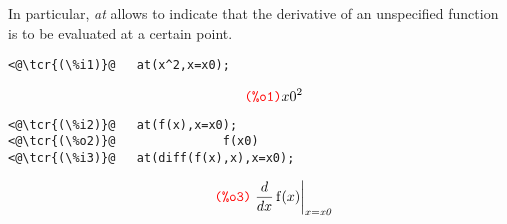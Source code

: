 \documentclass[../Maxima_Workbook.tex]{subfiles}
\begin{document}
\lz In particular, \emph{at} allows to indicate that the derivative of an unspecified function is to be evaluated at a certain point.

\lz \begin{small}
\color{blue} \leqn
\begin{lstlisting}
<@\tcr{(\%i1)}@   at(x^2,x=x0);
\end{lstlisting}
\vspace{-5mm} \[\tag*{\tcr{\ttfamily (\%o1)}} x0^2 \]
\vspace{-10mm} \begin{lstlisting}
<@\tcr{(\%i2)}@   at(f(x),x=x0);
<@\tcr{(\%o2)}@			      f(x0)
<@\tcr{(\%i3)}@   at(diff(f(x),x),x=x0);
\end{lstlisting}
\vspace{-5mm} \[\tag*{\tcr{\ttfamily (\%o3)}} \left. \frac{d}{d x} \operatorname{f}(x)\right|_{x=\mathit{x0}} \]
\color{black} \reqn
\end{small}
\end{document}
